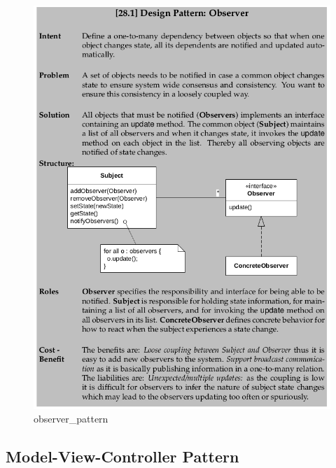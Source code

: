 \documentclass[11pt]{article}
\makeatletter
\def\maxwidth{\ifdim\Gin@nat@width>\linewidth\linewidth
    \else\Gin@nat@width\fi}
\let\Oldincludegraphics\includegraphics
\renewcommand{\includegraphics}[1]{\Oldincludegraphics[width=.8\maxwidth]{#1}}
\makeatother
\begin{document}
\begin{figure}
\centering
\includegraphics{img/observer_pattern.png}
\caption{observer\_pattern}
\end{figure}

\hypertarget{model-view-controller-pattern}{%
\subsection{Model-View-Controller
Pattern}\label{model-view-controller-pattern}}
\end{document}
